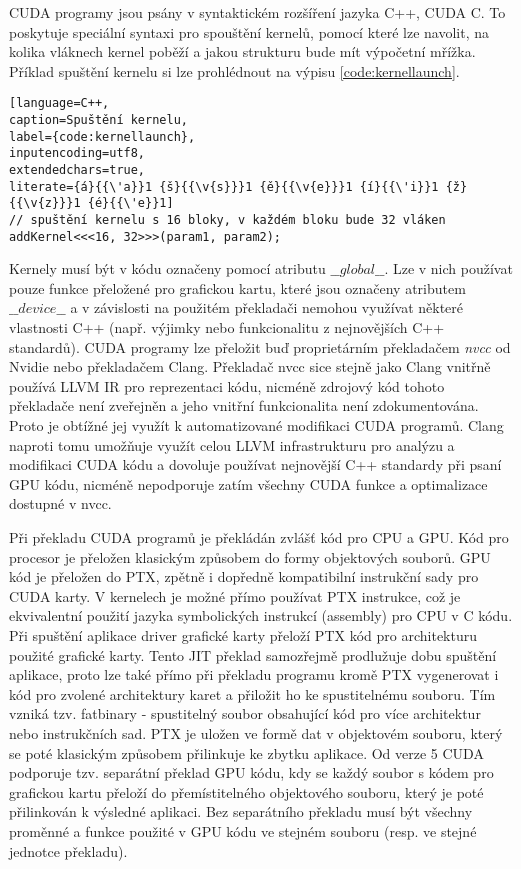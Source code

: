 CUDA programy jsou psány v syntaktickém rozšíření jazyka C++, CUDA C. To poskytuje speciální syntaxi pro spouštění kernelů, pomocí které lze navolit, na kolika vláknech kernel poběží a jakou strukturu bude mít výpočetní mřížka. Příklad spuštění kernelu si lze prohlédnout na výpisu \ref{code:kernellaunch}.

\begin{lstlisting}[language=C++,
caption=Spuštění kernelu,
label={code:kernellaunch},
inputencoding=utf8,
extendedchars=true,
literate={á}{{\'a}}1 {š}{{\v{s}}}1 {ě}{{\v{e}}}1 {í}{{\'i}}1 {ž}{{\v{z}}}1 {é}{{\'e}}1]
// spuštění kernelu s 16 bloky, v každém bloku bude 32 vláken
addKernel<<<16, 32>>>(param1, param2);
\end{lstlisting}

Kernely musí být v kódu označeny pomocí atributu $\_\_global\_\_$. Lze v nich používat pouze funkce přeložené pro grafickou kartu, které jsou označeny atributem $\_\_device\_\_$ a v závislosti na použitém překladači nemohou využívat některé vlastnosti C++ (např. výjimky nebo funkcionalitu z nejnovějších C++ standardů). CUDA programy lze přeložit buď proprietárním překladačem \emph{nvcc} od Nvidie nebo překladačem Clang. Překladač nvcc sice stejně jako Clang vnitřně používá LLVM IR pro reprezentaci kódu, nicméně zdrojový kód tohoto překladače není zveřejněn a jeho vnitřní funkcionalita není zdokumentována. Proto je obtížné jej využít k automatizované modifikaci CUDA programů. Clang naproti tomu umožňuje využít celou LLVM infrastrukturu pro analýzu a modifikaci CUDA kódu a dovoluje používat nejnovější C++ standardy při psaní GPU kódu, nicméně nepodporuje zatím všechny CUDA funkce a optimalizace dostupné v nvcc.

Při překladu CUDA programů je překládán zvlášť kód pro CPU a GPU. Kód pro procesor je přeložen klasickým způsobem do formy objektových souborů. GPU kód je přeložen do PTX, zpětně i dopředně kompatibilní instrukční sady pro CUDA karty. V kernelech je možné přímo používat PTX instrukce, což je ekvivalentní použití jazyka symbolických instrukcí (assembly) pro CPU v C kódu. Při spuštění aplikace driver grafické karty přeloží PTX kód pro architekturu použité grafické karty. Tento JIT překlad samozřejmě prodlužuje dobu spuštění aplikace, proto lze také přímo při překladu programu kromě PTX vygenerovat i kód pro zvolené architektury karet a přiložit ho ke spustitelnému souboru. Tím vzniká tzv. fatbinary - spustitelný soubor obsahující kód pro více architektur nebo instrukčních sad. PTX je uložen ve formě dat v objektovém souboru, který se poté klasickým způsobem přilinkuje ke zbytku aplikace. Od verze 5 CUDA podporuje tzv. separátní překlad GPU kódu, kdy se každý soubor s kódem pro grafickou kartu přeloží do přemístitelného objektového souboru, který je poté přilinkován k výsledné aplikaci. Bez separátního překladu musí být všechny proměnné a funkce použité v GPU kódu ve stejném souboru (resp. ve stejné jednotce překladu).


